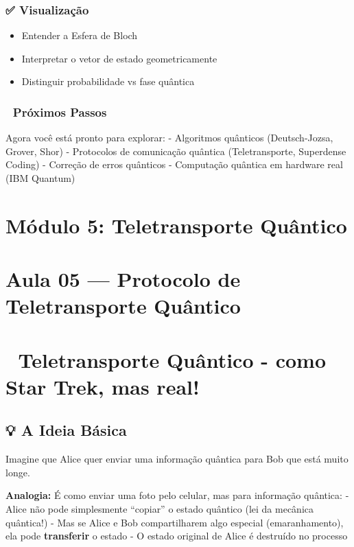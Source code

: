 \documentclass[
  brazilian,
]{report}
\providecommand{\tightlist}{%
  \setlength{\itemsep}{0pt}\setlength{\parskip}{0pt}}
\begin{document}
\subsection{✅ Visualização}\label{visualizauxe7uxe3o}

\begin{itemize}
\tightlist
\item
  Entender a Esfera de Bloch
\item
  Interpretar o vetor de estado geometricamente
\item
  Distinguir probabilidade vs fase quântica
\end{itemize}

\subsection{🚀 Próximos Passos}\label{pruxf3ximos-passos}

Agora você está pronto para explorar: - Algoritmos quânticos
(Deutsch-Jozsa, Grover, Shor) - Protocolos de comunicação quântica
(Teletransporte, Superdense Coding) - Correção de erros quânticos -
Computação quântica em hardware real (IBM Quantum)

\newpage

\chapter{Módulo 5: Teletransporte
Quântico}\label{muxf3dulo-5-teletransporte-quuxe2ntico}

\chapter{Aula 05 --- Protocolo de Teletransporte
Quântico}\label{aula-05-protocolo-de-teletransporte-quuxe2ntico}

\chapter{🚀 Teletransporte Quântico - como Star Trek, mas
real!}\label{teletransporte-quuxe2ntico---como-star-trek-mas-real}

\section{💡 A Ideia Básica}\label{a-ideia-buxe1sica}

Imagine que Alice quer enviar uma informação quântica para Bob que está
muito longe.

\textbf{Analogia:} É como enviar uma foto pelo celular, mas para
informação quântica: - Alice não pode simplesmente ``copiar'' o estado
quântico (lei da mecânica quântica!) - Mas se Alice e Bob compartilharem
algo especial (emaranhamento), ela pode \textbf{transferir} o estado - O
estado original de Alice é destruído no processo
\end{document}
